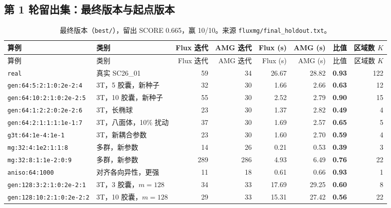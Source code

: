 \subsection{第 1 轮留出集：最终版本与起点版本}
{\footnotesize\setlength{\tabcolsep}{4pt}
\begin{longtable}{llrrrrrr}
\caption{最终版本（\texttt{best/}），留出 SCORE 0.665，赢 10/10。来源 \texttt{fluxmg/final\_holdout.txt}。}\\
\toprule
算例 & 类别 & Flux 迭代 & AMG 迭代 & Flux (s) & AMG (s) & 比值 & 区域数 $K$ \\
\midrule
\endfirsthead
\toprule
算例 & 类别 & Flux 迭代 & AMG 迭代 & Flux (s) & AMG (s) & 比值 & 区域数 $K$ \\
\midrule
\endhead
\bottomrule
\endlastfoot
\texttt{real} & 真实 SC26\_01 & 59 & 34 & 26.67 & 28.82 & \textbf{0.93} & 122 \\
\texttt{gen:64:5:2:1:0:2e-2:4} & 3T，5 胶囊，新种子 & 32 & 30 & 1.66 & 2.66 & \textbf{0.63} & 12 \\
\texttt{gen:64:10:2:1:0:2e-2:5} & 3T，10 胶囊，新种子 & 55 & 30 & 2.52 & 2.79 & \textbf{0.90} & 15 \\
\texttt{gen:64:1:2:2:0:2e-2:6} & 3T，长椭球 & 23 & 30 & 1.37 & 2.82 & \textbf{0.49} & 4 \\
\texttt{gen:64:2:1:1:1:1e-1:7} & 3T，八面体，10\% 扰动 & 37 & 30 & 1.69 & 2.57 & \textbf{0.65} & 5 \\
\texttt{g3t:64:1e-4:1e-1} & 3T，新耦合参数 & 23 & 30 & 1.60 & 2.70 & \textbf{0.59} & 4 \\
\texttt{mg:32:4:1e2:1:1:8} & 多群，新参数 & 14 & 26 & 0.21 & 0.53 & \textbf{0.39} & 3 \\
\texttt{mg:32:8:1:1e-2:0:9} & 多群，新参数 & 289 & 286 & 4.93 & 6.49 & \textbf{0.76} & 22 \\
\texttt{aniso:64:1000} & 对齐各向异性，更强 & 11 & 18 & 0.61 & 0.66 & \textbf{0.93} & 1 \\
\texttt{gen:128:3:2:1:0:2e-2:1} & 3T，3 胶囊，$m=128$ & 34 & 33 & 17.69 & 29.25 & \textbf{0.60} & 8 \\
\texttt{gen:128:10:2:1:0:2e-2:2} & 3T，10 胶囊，$m=128$ & 29 & 33 & 15.31 & 27.42 & \textbf{0.56} & 22 \\
\end{longtable}}
